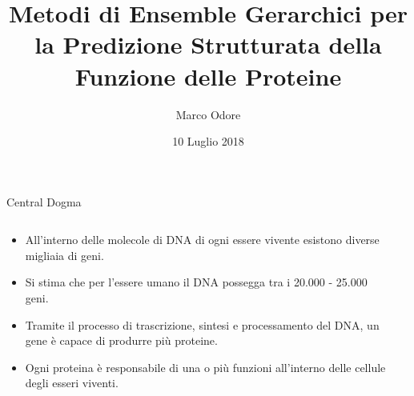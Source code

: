 \documentclass{beamer}
\author{Marco Odore}
\title[Metodi di Ensemble Gerarchici]{Metodi di Ensemble Gerarchici per la Predizione Strutturata della Funzione delle Proteine}
\date{10 Luglio 2018}
\begin{document}
\titlepageframe
\begin{tframe}{Central Dogma}
  \begin{columns}
    \begin{column}{.65\textwidth}
      \minipage[c][0.4\textheight][s]{\columnwidth}
	   \begin{itemize}	
	  \item All'interno delle molecole di DNA di ogni essere vivente esistono diverse migliaia di geni.   
	  \item Si stima che per l'essere umano il DNA possegga tra i 20.000 - 25.000 geni.
      \item Tramite il processo di trascrizione, sintesi e processamento del DNA, un gene è capace di produrre più proteine.	
      \item Ogni proteina è responsabile di una o più funzioni all'interno delle cellule degli esseri viventi.
      \end{itemize}
      \endminipage      
    \end{column}
    \begin{column}{.35\textwidth}



    \end{column}
  \end{columns}

\end{tframe}
\end{document}
